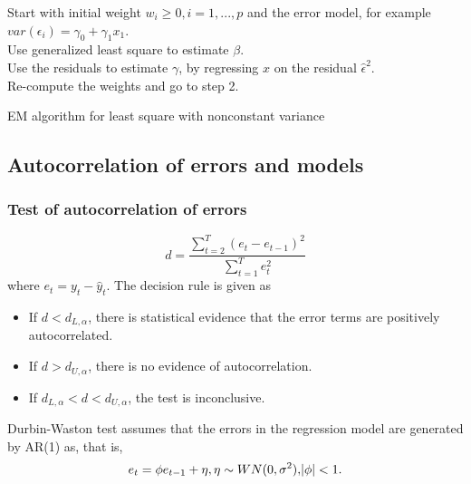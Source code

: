 \begin{refsection}
\begin{algorithm}[H]
	\SetAlgoLined
	Start with initial weight $w_i\geq 0,i=1,...,p$ and the error model, for example $var(\epsilon_i) = \gamma_0 + \gamma_1x_1$.\\
	Use generalized least square to estimate $\beta$.\\
	Use the residuals to estimate $\gamma$, by regressing $x$ on the residual $\hat{\epsilon}^2$.\\
	Re-compute the weights and go to step 2.\\
	\caption{EM algorithm for least square with nonconstant variance}
\end{algorithm}


\subsection{Autocorrelation of errors and models}
\subsubsection{Test of autocorrelation of errors}
\begin{definition}
	$$d = \frac{\sum_{t=2}^T (e_t - e_{t-1})^2}{\sum_{t=1}^T e_t^2}$$
	where $e_t = y_t - \hat{y}_t$.
	The decision rule is given as
	\begin{itemize}
		\item 	If $d < d_{L,\alpha}$, there is statistical evidence that the error terms are positively autocorrelated.
		\item 	If $d > d_{U,\alpha}$, there is no evidence of autocorrelation.
		\item 	If $d_{L,\alpha} < d < d_{U,\alpha}$, the test is inconclusive.
	\end{itemize}
\end{definition}

\begin{remark}
	Durbin-Waston test assumes that the errors
	in the regression model are generated by AR(1) as, that is,
	$$e_{t} = \phi e_{t-1} + \eta,\eta\sim WN(0,\sigma^2),\abs{\phi}<1.$$
\end{remark}


\end{refsection}
